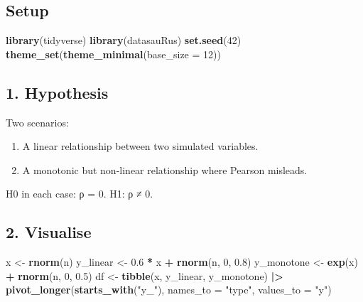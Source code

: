 \documentclass[
]{article}
\newenvironment{Shaded}{\begin{snugshade}}{\end{snugshade}}
\newcommand{\AttributeTok}[1]{\textcolor[rgb]{0.13,0.29,0.53}{#1}}
\newcommand{\DecValTok}[1]{\textcolor[rgb]{0.00,0.00,0.81}{#1}}
\newcommand{\FloatTok}[1]{\textcolor[rgb]{0.00,0.00,0.81}{#1}}
\newcommand{\FunctionTok}[1]{\textcolor[rgb]{0.13,0.29,0.53}{\textbf{#1}}}
\newcommand{\NormalTok}[1]{#1}
\newcommand{\OtherTok}[1]{\textcolor[rgb]{0.56,0.35,0.01}{#1}}
\newcommand{\SpecialCharTok}[1]{\textcolor[rgb]{0.81,0.36,0.00}{\textbf{#1}}}
\newcommand{\StringTok}[1]{\textcolor[rgb]{0.31,0.60,0.02}{#1}}
\providecommand{\tightlist}{%
  \setlength{\itemsep}{0pt}\setlength{\parskip}{0pt}}
\begin{document}
\subsection{Setup}\label{setup}

\begin{Shaded}
\begin{Highlighting}[]
\FunctionTok{library}\NormalTok{(tidyverse)}
\FunctionTok{library}\NormalTok{(datasauRus)}
\FunctionTok{set.seed}\NormalTok{(}\DecValTok{42}\NormalTok{)}
\FunctionTok{theme\_set}\NormalTok{(}\FunctionTok{theme\_minimal}\NormalTok{(}\AttributeTok{base\_size =} \DecValTok{12}\NormalTok{))}
\end{Highlighting}
\end{Shaded}

\subsection{1. Hypothesis}\label{hypothesis}

Two scenarios:

\begin{enumerate}
\def\labelenumi{\arabic{enumi}.}
\tightlist
\item
  A linear relationship between two simulated variables.
\item
  A monotonic but non-linear relationship where Pearson misleads.
\end{enumerate}

H0 in each case: ρ = 0. H1: ρ ≠ 0.

\subsection{2. Visualise}\label{visualise}

\begin{Shaded}
\begin{Highlighting}[]
\NormalTok{x }\OtherTok{\textless{}{-}} \FunctionTok{rnorm}\NormalTok{(n)}
\NormalTok{y\_linear   }\OtherTok{\textless{}{-}} \FloatTok{0.6} \SpecialCharTok{*}\NormalTok{ x }\SpecialCharTok{+} \FunctionTok{rnorm}\NormalTok{(n, }\DecValTok{0}\NormalTok{, }\FloatTok{0.8}\NormalTok{)}
\NormalTok{y\_monotone }\OtherTok{\textless{}{-}} \FunctionTok{exp}\NormalTok{(x) }\SpecialCharTok{+} \FunctionTok{rnorm}\NormalTok{(n, }\DecValTok{0}\NormalTok{, }\FloatTok{0.5}\NormalTok{)}
\NormalTok{df }\OtherTok{\textless{}{-}} \FunctionTok{tibble}\NormalTok{(x, y\_linear, y\_monotone) }\SpecialCharTok{|\textgreater{}}
  \FunctionTok{pivot\_longer}\NormalTok{(}\FunctionTok{starts\_with}\NormalTok{(}\StringTok{"y\_"}\NormalTok{), }\AttributeTok{names\_to =} \StringTok{"type"}\NormalTok{, }\AttributeTok{values\_to =} \StringTok{"y"}\NormalTok{)}
\end{Highlighting}
\end{Shaded}
\end{document}
